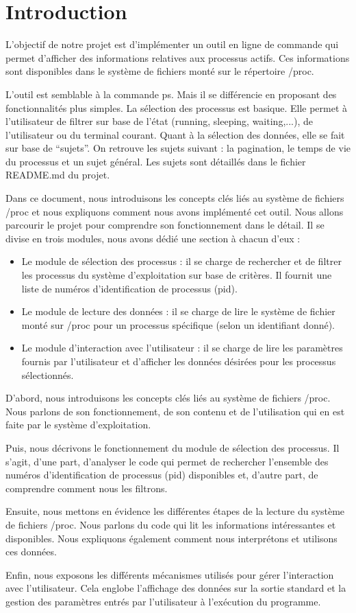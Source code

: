 \section{Introduction}
L’objectif de notre projet est d’implémenter un outil en ligne de commande qui permet d’afficher des informations relatives aux processus actifs. Ces informations sont disponibles dans le système de fichiers monté sur le répertoire /proc.

L’outil est semblable à la commande ps. Mais il se différencie en proposant des fonctionnalités plus simples.  La sélection des processus est basique. Elle permet à l’utilisateur de filtrer sur base de l’état (running, sleeping, waiting,...), de l’utilisateur ou du terminal courant. Quant à la sélection des données, elle se fait sur base de “sujets”. On retrouve les sujets suivant : la pagination, le temps de vie du processus et un sujet général. Les sujets sont détaillés dans le fichier README.md du projet.

Dans ce document, nous introduisons les concepts clés liés au système de fichiers /proc et nous expliquons comment nous avons implémenté cet outil. Nous allons parcourir le projet pour comprendre son fonctionnement dans le détail. Il se divise en trois modules, nous avons dédié une section à chacun d’eux :

\begin{itemize}
\item Le module de sélection des processus : il se charge de rechercher et de filtrer les processus du système d’exploitation sur base de critères. Il fournit une liste de numéros d’identification de processus (pid).
\item Le module de lecture des données : il se charge de lire le système de fichier monté sur /proc pour un processus spécifique (selon un identifiant donné).
\item Le module d’interaction avec l’utilisateur : il se charge de lire les paramètres fournis par l’utilisateur et d’afficher les données désirées pour les processus sélectionnés.
\end{itemize}

D’abord, nous introduisons les concepts clés liés au système de fichiers /proc. Nous parlons de son fonctionnement, de son contenu et de l'utilisation qui en est faite par le système d'exploitation.

Puis, nous décrivons le fonctionnement du module de sélection des processus. Il s’agit, d’une part, d’analyser le code qui permet de rechercher l’ensemble des numéros d’identification de processus (pid) disponibles et, d’autre part, de comprendre comment nous les filtrons.

Ensuite, nous mettons en évidence les différentes étapes de la lecture du système de fichiers /proc. Nous parlons du code qui lit les informations intéressantes et disponibles. Nous expliquons également comment nous interprétons et utilisons ces données.

Enfin, nous exposons les différents mécanismes utilisés pour gérer l’interaction avec l’utilisateur. Cela englobe l’affichage des données sur la sortie standard et la gestion des paramètres entrés par l’utilisateur à l’exécution du programme.
